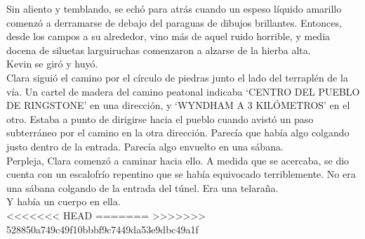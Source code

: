 {Sin aliento y temblando, se echó para atrás cuando un espeso líquido
amarillo comenzó a derramarse de debajo del paraguas de dibujos
brillantes. Entonces, desde los campos a su alrededor, vino más de aquel
ruido horrible, y media docena de siluetas larguiruchas comenzaron a
alzarse de la hierba alta.\\
Kevin se giró y huyó.\\[2\baselineskip]Clara siguió el camino por el
círculo de piedras junto el lado del terraplén de la vía. Un cartel de
madera del camino peatonal indicaba `CENTRO DEL PUEBLO DE RINGSTONE' en
una dirección, y `WYNDHAM A 3 KILÓMETROS' en el otro. Estaba a punto de
dirigirse hacia el pueblo cuando avistó un paso subterráneo por el
camino en la otra dirección. Parecía que había algo colgando justo
dentro de la entrada. Parecía algo envuelto en una sábana.\\
Perpleja, Clara comenzó a caminar hacia ello. A medida que se acercaba,
se dio cuenta con un escalofrío repentino que se había equivocado
terriblemente. No era una sábana colgando de la entrada del túnel. Era
una telaraña.\\
Y había un cuerpo en ella.\\
<<<<<<< HEAD
=======
}
>>>>>>> 528850a749c49f10bbbf9c7449da53e9dbc49a1f
